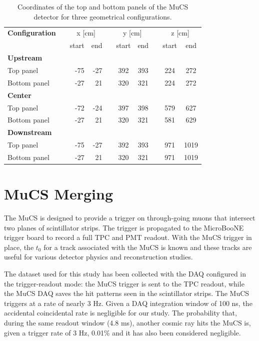 \documentclass[a4paper]{scrartcl}
\begin{document}
\begin{table}[htbp]
  \centering
  \begin{tabular}{lcrrrccccc}
    \toprule
    \textbf{Configuration} & \phantom{abc}& \multicolumn{2}{c}{x [cm]} & \phantom{abc} & \multicolumn{2}{c}{y [cm]} & \phantom{abc} & \multicolumn{2}{c}{z [cm]}\\
    \cmidrule{3-4} \cmidrule{6-7} \cmidrule{9-10}
    & & start & end & & start & end & & start & end\\
    \midrule

    \textbf{Upstream} & & & & & & & & & \\
    Top panel & & -75 & -27 & & 392 & 393 & & 224 & 272\\
    Bottom panel & & -27 & 21 & & 320 & 321 & & 224 & 272\\

    \midrule
    \textbf{Center} & & & & & & & & & \\
    Top panel & & -72 & -24 & & 397 & 398 & & 579 & 627\\
    Bottom panel & & -27 & 21 & & 320 & 321 & & 581 & 629\\
    \midrule
    \textbf{Downstream} & & & & & & & & & \\
    Top panel & & -75 & -27 & & 392 & 393 & & 971 & 1019\\
    Bottom panel & & -27 & 21 & & 320 & 321 & & 971 & 1019\\
    \bottomrule

  \end{tabular}
  \caption{Coordinates of the top and bottom panels of the MuCS detector for three geometrical configurations.}\label{tab:mucs}
\end{table}


\section{MuCS Merging}\label{sec:merging}
The MuCS is designed to provide a trigger on through-going muons that intersect two planes of scintillator strips. The trigger is propagated to the MicroBooNE trigger board to record a full TPC and PMT readout. With the MuCS trigger in place, the $t_0$ for a track associated with the MuCS is known and these tracks are useful for various detector physics and reconstruction studies.

The dataset used for this study has been collected with the DAQ configured in the trigger-readout mode: the MuCS trigger is sent to the TPC readout, while the MuCS DAQ saves the hit patterns seen in the scintillator strips.
The MuCS triggers at a rate of nearly 3 Hz.
Given a DAQ integration window of 100 ns, the accidental coincidental rate is negligible for our study. The probability that, during the same readout window (4.8 ms), another cosmic ray hits the MuCS is, given a trigger rate of 3 Hz, 0.01\% and it has also been considered negligible.
\end{document}
